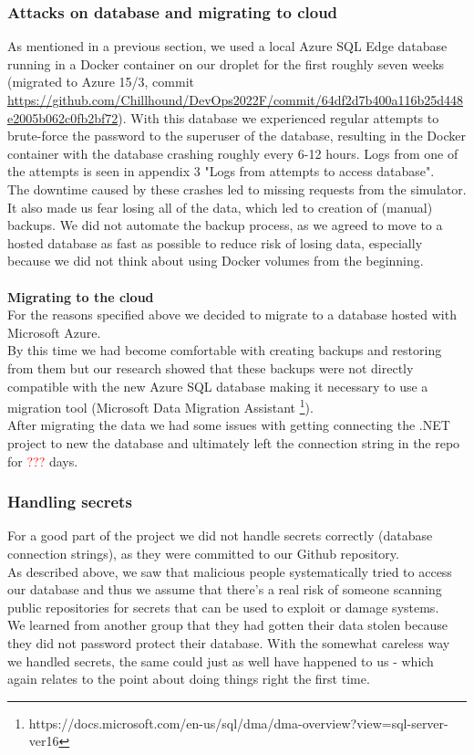 \subsubsection{Attacks on database and migrating to cloud}
As mentioned in a previous section, we used a local Azure SQL Edge database running in a Docker container on our droplet for the first roughly seven weeks (migrated to Azure 15/3, commit \url{https://github.com/Chillhound/DevOps2022F/commit/64df2d7b400a116b25d448e2005b062c0fb2bf72}). With this database we experienced regular attempts to brute-force the password to the superuser of the database, resulting in the Docker container with the database crashing roughly every 6-12 hours. Logs from one of the attempts is seen in appendix 3 "Logs from attempts to access database". \\
The downtime caused by these crashes led to missing requests from the simulator. It also made us fear losing all of the data, which led to creation of (manual) backups. We did not automate the backup process, as we agreed to move to a hosted database as fast as possible to reduce risk of losing data, especially because we did not think about using Docker volumes from the beginning. 
\\ \\
\textbf{Migrating to the cloud} \\
For the reasons specified above we decided to migrate to a database hosted with Microsoft Azure. \\
By this time we had become comfortable with creating backups and restoring from them but our research showed that 
these backups were not directly compatible with the new Azure SQL database making it necessary to use a migration tool (Microsoft Data Migration Assistant \footnote{https://docs.microsoft.com/en-us/sql/dma/dma-overview?view=sql-server-ver16}). \\
After migrating the data we had some issues with getting connecting the .NET project to new the database and ultimately 
left the connection string in the repo for \textcolor{red}{???} days. 


\subsubsection{Handling secrets}
For a good part of the project we did not handle secrets correctly (database connection strings), as they were committed to our Github repository. \\
As described above, we saw that malicious people systematically tried to access our database and thus we assume that there's a real risk of someone scanning public repositories for secrets that can be used to exploit or damage systems. \\
We learned from another group that they had gotten their data stolen because they did not password protect their database.
With the somewhat careless way we handled secrets, the same could just as well have happened to us - which again relates to the point about doing things right the first time. \\


